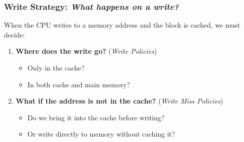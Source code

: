 \subsubsection{Write Strategy: \emph{What happens on a write?}}\label{subsubsection: write strategy}

When the CPU writes to a memory address and the block is cached, we must decide:
\begin{enumerate}
    \item \textbf{Where does the write go?} (\emph{Write Policies})
    \begin{itemize}
        \item Only in the cache?
        \item In both cache and main memory?
    \end{itemize}
    \item \textbf{What if the address is not in the cache?} (\emph{Write Miss Policies})
    \begin{itemize}
        \item Do we bring it into the cache before writing?
        \item Or write directly to memory without caching it?
    \end{itemize}
\end{enumerate}

